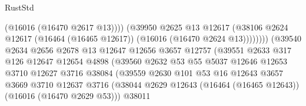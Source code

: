 \begin{lexlean}{RustStd}
\begin{coremodule}
                                              (@16016 (@16470 @2617 @13))))
                                          (@39950
                                            @2625
                                            @13
                                            @12617
                                            (@38106
                                              @2624
                                              @12617
                                              (@16464 (@16465 @12617))
                                              (@16016 (@16470 @2624 @13))))))))
                                  (@39540
                                    @2634
                                    @2656
                                    @2678
                                    @13
                                    @12647
                                    @12656
                                    @3657
                                    @12757
                                    (@39551
                                      @2633
                                      @317
                                      @126
                                      @12647
                                      @12654
                                      @4898
                                      (@39560
                                        @2632
                                        @53
                                        @55
                                        @5037
                                        @12646
                                        @12653
                                        @3710
                                        @12627
                                        @3716
                                        @38084
                                        (@39559
                                          @2630
                                          @101
                                          @53
                                          @16
                                          @12643
                                          @3657
                                          @3669
                                          @3710
                                          @12637
                                          @3716
                                          (@38044
                                            @2629
                                            @12643
                                            (@16464 (@16465 @12643))
                                            (@16016 (@16470 @2629 @53)))
                                          @38011

\end{coremodule}
\end{lexlean}
